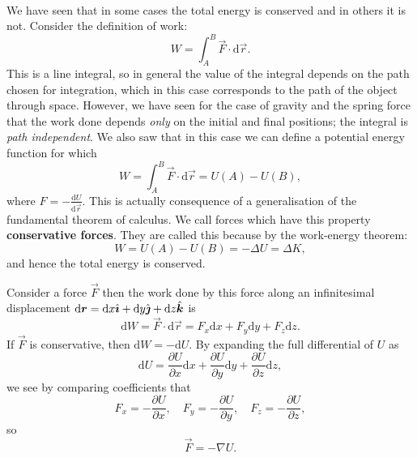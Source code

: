 \documentclass[../classical_mechanics.tex]{subfiles}
\begin{document}
        \paragraph{}
        We have seen that in some cases the total energy is conserved and in others it is not.
        Consider the definition of work:
        \begin{equation}
            W=\int_A^B \vec{F}\cdot\mathrm{d}\vec{r}.
        \end{equation}
        This is a line integral, so in general the value of the integral depends on the path chosen for integration, which in this case corresponds to the path of the object through space.
        However, we have seen for the case of gravity and the spring force that the work done depends \textit{only} on the initial and final positions; the integral is \textit{path independent}.
        We also saw that in this case we can define a potential energy function for which
        \begin{equation}
            W=\int_A^B \vec{F}\cdot\mathrm{d}\vec{r} = U(A) - U(B),
        \end{equation}
        where $F=-\frac{\mathrm{d}U}{\mathrm{d}\vec{r}}$.
        This is actually consequence of a generalisation of the fundamental theorem of calculus.
        We call forces which have this property \textbf{conservative forces}.
        They are called this because by the work-energy theorem:
        \begin{equation}
            W = U(A) - U(B) = -\Delta U = \Delta K,
        \end{equation}
        and hence the total energy is conserved.
        \begin{example}
            Consider a force $\vec{F}$ then the work done by this force along an infinitesimal displacement $\mathrm{d}\boldsymbol{r}=\mathrm{d}x\hat{\boldsymbol{\imath}}+\mathrm{d}y\hat{\boldsymbol{\jmath}}+\mathrm{d}z\hat{\boldsymbol{k}}$ is
            \begin{equation}
                \mathrm{d}W = \vec{F}\cdot\mathrm{d}\vec{r}=F_x\mathrm{d}x+F_y\mathrm{d}y+F_z\mathrm{d}z.
            \end{equation}
            If $\vec{F}$ is conservative, then $\mathrm{d}W=-\mathrm{d}U$. By expanding the full differential of $U$ as
            \begin{equation}
                \mathrm{d}U=\frac{\partial U}{\partial x}\mathrm{d}x+\frac{\partial U}{\partial y}\mathrm{d}y+\frac{\partial U}{\partial z}\mathrm{d}z,
            \end{equation}
            we see by comparing coefficients that
            \begin{equation}
                F_x=-\frac{\partial U}{\partial x}, \quad F_y=-\frac{\partial U}{\partial y}, \quad F_z=-\frac{\partial U}{\partial z},
            \end{equation}
            so
            \begin{equation}
                \vec{F}=-\nabla U.
            \end{equation}
        \end{example}
\end{document}
